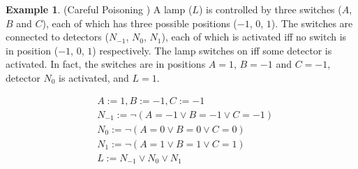 \documentclass[11pt,a4paper]{book}
\theoremstyle{definition}
\theoremstyle{definition}
\newtheorem{example}{Example}[section]
\theoremstyle{definition}
\theoremstyle{remark}
\begin{document}
\begin{example}(Careful Poisoning \cite{Weslake2015partialtheory})
A lamp ($L$) is controlled by three switches ($A$, $B$ and $C$), each of which has three possible positions ($-1$, $0$, $1$). The switches are connected to detectors ($N_{-1}$, $N_0$, $N_1$), each of which is activated iff no switch is in position ($-1$, $0$, $1$) respectively. The lamp switches on iff some detector is activated. In fact, the switches are in positions $A=1$, $B=-1$ and $C=-1$, detector $N_0$ is activated, and $L=1$.


\begin{equation*}
\begin{split}
&A:=1, B:=-1, C:=-1\\
&N_{-1}:=\neg (A=-1 \lor B=-1 \lor C=-1) \\
&N_{0}:=\neg (A=0 \lor B=0 \lor C=0) \\
&N_{1}:=\neg (A=1 \lor B=1 \lor C=1) \\
&L:= N_{-1} \lor N_0 \lor N_1 \\
\end{split}
\end{equation*}
\begin{center}
\end{center}
\end{example}
\end{document}
